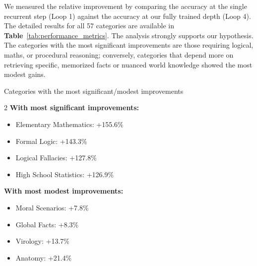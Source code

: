 \documentclass[]{bytedance_seed}
\newcommand{\1}{\mathbf{1}}
\begin{document}
{We measured the relative improvement by comparing the accuracy at the single recurrent step (Loop 1) against the accuracy at our fully trained depth (Loop 4). The detailed results for all 57 categories are available in \textbf{Table}~\ref{tab:performance_metrics}.
The analysis strongly supports our hypothesis. The categories with the most significant improvements are those requiring logical, maths, or procedural reasoning; conversely, categories that depend more on retrieving specific, memorized facts or nuanced world knowledge showed the most modest gains.

\begin{theobox*}{Categories with the most significant/modest improvements}
\vspace{0.05cm}
\small{
\vspace{0.05cm}

    \begin{multicols}{2}
        \hspace{-10pt}
        \colorbox{red!12}{\textbf{With most significant improvements:}}
        \vspace{0.1cm}

        \begin{itemize}[itemsep=0.0pt,topsep=0pt,leftmargin=*]
            \item {Elementary Mathematics}: +155.6\%
            \item {Formal Logic}: +143.3\%
            \item {Logical Fallacies}: +127.8\%
            \item {High School Statistics}: +126.9\%
        \end{itemize}
        \columnbreak
        \hspace{-10pt}
        \colorbox{blue!12}{\textbf{With most modest improvements:}}
        \vspace{0.1cm}

        \begin{itemize}[itemsep=0.0pt,topsep=0pt,leftmargin=*]
            \item {Moral Scenarios}: +7.8\%
            \item {Global Facts}: +8.3\%
            \item {Virology}: +13.7\%
            \item {Anatomy}: +21.4\%
        \end{itemize}
    \end{multicols}}
\end{theobox*}


}
\end{document}
